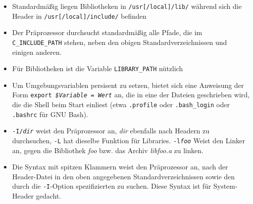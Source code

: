 \documentclass{article}
\begin{document}
   \begin{itemize}
      \item Standardmäßig liegen Bibliotheken in \texttt{/usr[/local]/lib/}
         während sich die Header in \texttt{/usr[/local]/include/} befinden
      \item Der Präprozessor durchsucht standardmäßig alle Pfade, die im
         \texttt{C\_INCLUDE\_PATH} stehen, neben
         den obigen Standardverzeichnissen und einigen anderen.
      \item Für Bibliotheken ist die Variable \texttt{LIBRARY\_PATH} nützlich
      \item Um Umgebungsvariablen persisent zu setzen, bietet sich eine
         Anweisung der Form \texttt{export \emph{\$Variable} = \emph{Wert}} an,
         die in eine der Dateien geschrieben wird, die die Shell beim Start
         einliest (etwa \texttt{.profile} oder \texttt{.bash\_login} oder
         \texttt{.bashrc} für GNU Bash).
      \item \texttt{-I/\emph{dir}} weist den Präprozessor an, \emph{dir}
         ebenfalls nach Headern zu durchsuchen, \texttt{-L} hat dieselbe
         Funktion für Libraries. \texttt{-l\emph{foo}} Weist den Linker an,
         gegen die Bibliothek \emph{foo} bzw. das Archiv \emph{libfoo.a} zu
         linken.
      \item Die Syntax mit spitzen Klammern weist den Präprozessor an, nach der
         Header-Datei in den oben angegebenen Standardverzeichnissen sowie den
         durch die \texttt{-I}-Option spezifizierten zu suchen.
         Diese Syntax ist für System-Header gedacht.


\end{itemize}
\end{document}
